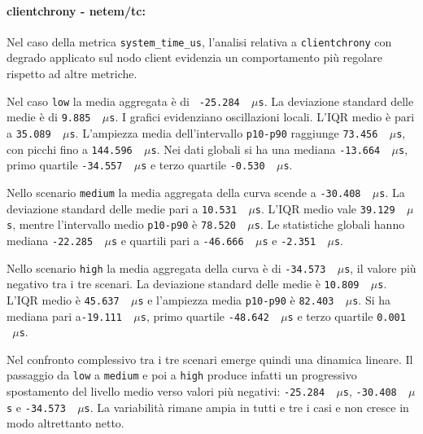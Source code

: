 \paragraph*{clientchrony - netem/tc:}
Nel caso della metrica \texttt{system\_time\_us}, l'analisi relativa a \texttt{clientchrony}
con degrado applicato sul nodo client evidenzia un comportamento più regolare rispetto
ad altre metriche.

Nel caso \texttt{low} la media aggregata è di ~\texttt{-25.284 \,$\mu$s}. La deviazione
standard delle medie è di \texttt{9.885 \,$\mu$s}. I grafici evidenziano oscillazioni
locali. L'IQR medio è pari a \texttt{35.089 \,$\mu$s}. L'ampiezza media dell'intervallo
\texttt{p10-p90} raggiunge \texttt{73.456 \,$\mu$s}, con picchi fino a \texttt{144.596
\,$\mu$s}. Nei dati globali si ha una mediana \texttt{-13.664 \,$\mu$s}, primo quartile
\texttt{-34.557 \,$\mu$s} e terzo quartile \texttt{-0.530 \,$\mu$s}.

Nello scenario \texttt{medium} la media aggregata della curva scende a \texttt{-30.408
\,$\mu$s}. La deviazione standard delle medie pari a \texttt{10.531 \,$\mu$s}. L'IQR
medio vale \texttt{39.129 \,$\mu$s}, mentre l'intervallo medio \texttt{p10-p90} è
\texttt{78.520 \,$\mu$s}. Le statistiche globali hanno mediana \texttt{-22.285 \,$\mu$s}
e quartili pari a \texttt{-46.666 \,$\mu$s} e \texttt{-2.351 \,$\mu$s}.

Nello scenario \texttt{high} la media aggregata della curva è di \texttt{-34.573 \,$\mu$s},
il valore più negativo tra i tre scenari. La deviazione standard delle medie è
\texttt{10.809 \,$\mu$s}. L'IQR medio è \texttt{45.637 \,$\mu$s} e l'ampiezza media
\texttt{p10-p90} è \texttt{82.403 \,$\mu$s}. Si ha mediana pari a\texttt{-19.111 \,$\mu$s},
primo quartile \texttt{-48.642 \,$\mu$s} e terzo quartile \texttt{0.001 \,$\mu$s}.

Nel confronto complessivo tra i tre scenari emerge quindi una dinamica lineare.
Il passaggio da \texttt{low} a \texttt{medium} e poi a \texttt{high} produce infatti
un progressivo spostamento del livello medio verso valori più negativi: \texttt{-25.284
\,$\mu$s}, \texttt{-30.408 \,$\mu$s} e \texttt{-34.573 \,$\mu$s}. La variabilità rimane
ampia in tutti e tre i casi e non cresce in modo altrettanto netto.

